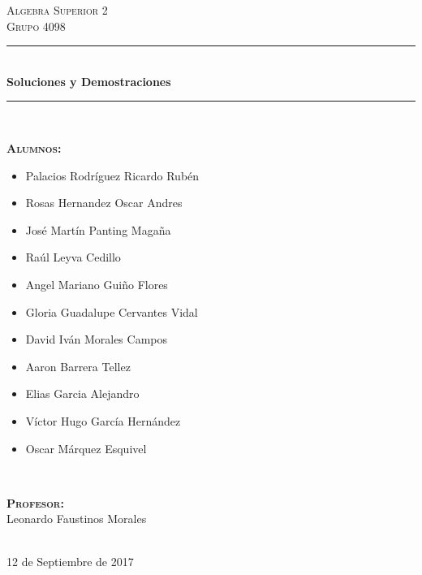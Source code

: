 \documentclass[12pt, fleqn]{article}                             %
\author{Oscar Andrés Rosas}                                     %
\begin{document}
\begin{titlepage}

    \center
    \textsc{\Large Algebra Superior 2}\\[0.5cm] 
    \textsc{\large Grupo 4098}\\[1.0cm]

    \rule{\linewidth}{0.5mm} \\[1.0cm]
        { \huge \bfseries Soluciones y Demostraciones}\\[1.0cm] 
    \rule{\linewidth}{0.5mm} \\[1.5cm]
     
    \begin{minipage}{0.55\textwidth}
        \begin{flushleft}
            \footnotesize{
            \textbf{\textsc{Alumnos:}}\\
                \begin{itemize}
                    \item Palacios Rodríguez Ricardo Rubén
                    \item Rosas Hernandez Oscar Andres
                    \item José Martín Panting Magaña
                    \item Raúl Leyva Cedillo
                    \item Angel Mariano Guiño Flores
                    \item Gloria Guadalupe Cervantes Vidal
                    \item David Iván Morales Campos
                    \item Aaron Barrera Tellez
                    \item Elias Garcia Alejandro
                    \item Víctor Hugo García Hernández
                    \item Oscar Márquez Esquivel
                \end{itemize}
            }
        \end{flushleft}
    \end{minipage}
    ~
    \begin{minipage}{0.4\textwidth}
        \begin{flushright} \footnotesize
            \textbf{\textsc{Profesor: }}\\
            Leonardo Faustinos Morales
        \end{flushright}
    \end{minipage}\\[3,5cm]

    
    {\large 12 de Septiembre de 2017}\\[1cm] 

    \vfill

\end{titlepage}
\end{document}
